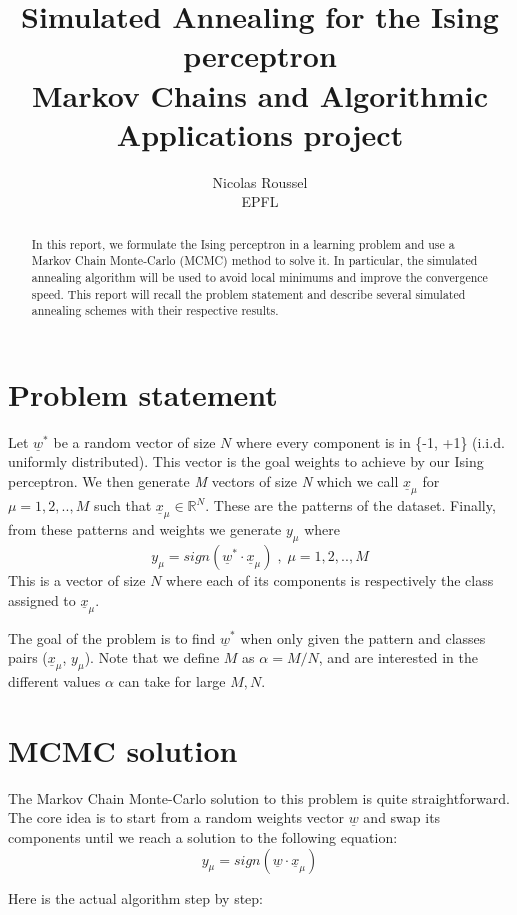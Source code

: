 \documentclass[a4paper]{article}
\title{
Simulated Annealing for the Ising perceptron \\
Markov Chains and Algorithmic Applications project}
\author{
Nicolas Roussel\\
EPFL}
\begin{document}
\maketitle

\begin{abstract}
In this report, we formulate the Ising perceptron in a learning problem and use a Markov Chain Monte-Carlo (MCMC) method to solve it. In particular, the simulated annealing algorithm will be used to avoid local minimums and improve the convergence speed. This report will recall the problem statement and describe several simulated annealing schemes with their respective results.\end{abstract}

\section{Problem statement}

Let $\underline{w}^*$ be a random vector of size $N$ where every component is in \{-1, +1\} (i.i.d. uniformly distributed). This vector is the goal weights to achieve by our Ising perceptron. We then generate \textit{M} vectors of size \textit{N} which we call $\underline{x}_{\mu}$ for $\mu = 1, 2, .., M$ such that $\underline{x}_{\mu} \in \mathbb{R}^{N}$. These are the patterns of the dataset. Finally, from these patterns and weights we generate $y_{\mu}$ where
\[y_{\mu} = sign(\underline{w}^* \cdot \underline{x}_{\mu}) \;, \;\mu = 1, 2, .., M\]
This is a vector of size $N$ where each of its components is respectively the class assigned to $\underline{x}_{\mu}$.

The goal of the problem is to find $\underline{w}^*$ when only given the pattern and classes pairs ($\underline{x}_{\mu}$, $y_{\mu}$). Note that we define $M$ as $\alpha = M/N$, and are interested in the different values $\alpha$ can take for large $M, N$.  

\section{MCMC solution}\label{MCMC_SOL}

The Markov Chain Monte-Carlo solution to this problem is quite straightforward. The core idea is to start from a random weights vector $\underline{w}$ and swap its components until we reach a solution to the following equation: 
 \[y_{\mu} = sign(\underline{w} \cdot \underline{x}_{\mu})\]
 
 Here is the actual algorithm step by step:
 
\end{document}
